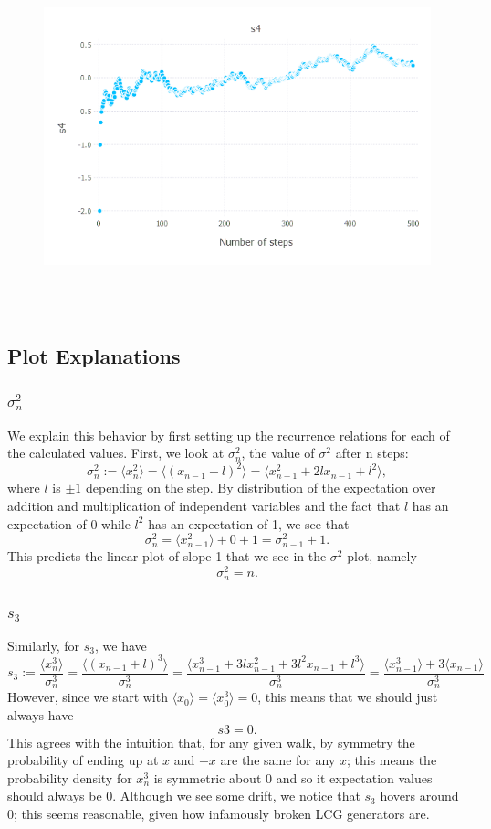 \documentclass{article}
\begin{document}
\begin{figure}[H]
	\includegraphics[width=6in,height=4in]{"fr"}
\end{figure}
\subsection{Plot Explanations}
\subsubsection{$\sigma_n^2$}
We explain this behavior by first setting up the recurrence relations for each of the calculated values. First, we look at $\sigma_n^2$, the value of $\sigma^2$ after n steps:
$$\sigma_n^2 := \langle x_n^2 \rangle = \langle (x_{n-1}+l)^2 \rangle =  \langle x_{n-1}^2 + 2lx_{n-1} + l^2 \rangle,$$
where $l$ is $\pm1$ depending on the step. By distribution of the expectation over addition and multiplication of independent variables and the fact that $l$ has an expectation of 0 while $l^2$ has an expectation of 1, we see that
$$\sigma_n^2 = \langle x_{n-1}^2 \rangle + 0 + 1 = \sigma_{n-1}^2 + 1.$$
This predicts the linear plot of slope 1 that we see in the $\sigma^2$ plot, namely
$$\sigma_n^2 = n.$$
\subsubsection{$s_3$}
Similarly, for $s_3$, we have
$$s_3 := \frac{\langle x_n^3 \rangle}{\sigma_n^3} = \frac{\langle (x_{n-1}+l)^3 \rangle}{\sigma_n^3} = \frac{\langle x_{n-1}^3 + 3lx_{n-1}^2 + 3l^2x_{n-1} + l^3 \rangle}{\sigma_n^3} = \frac{\langle x_{n-1}^3 \rangle + 3\langle x_{n-1} \rangle}{\sigma_n^3}$$
However, since we start with $\langle x_0 \rangle = \langle x_0^3 \rangle = 0$, this means that we should just always have
$$s3 = 0.$$
This agrees with the intuition that, for any given walk, by symmetry the probability of ending up at $x$ and $-x$ are the same for any $x$; this means the probability density for $x_n^3$ is symmetric about 0 and so it expectation values should always be 0.
Although we see some drift, we notice that $s_3$ hovers around 0; this seems reasonable, given how infamously broken LCG generators are.
\end{document}
